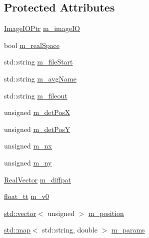 \subsection*{Protected Attributes}
\begin{DoxyCompactItemize}
\item 
\hyperlink{namespace_q_s_t_e_m_a4983475ef18f1a1f4bbfaabb6d187b9a}{Image\-I\-O\-Ptr} \hyperlink{class_q_s_t_e_m_1_1_c_base_wave_ac94d4576239a0b5f7cc82752b9b0b27e}{m\-\_\-image\-I\-O}
\item 
bool \hyperlink{class_q_s_t_e_m_1_1_c_base_wave_aeaa99c25f2184ccb5142d6204c77059b}{m\-\_\-real\-Space}
\item 
std\-::string \hyperlink{class_q_s_t_e_m_1_1_c_base_wave_ac5cc9c0ec149ffa044f94effb4deda85}{m\-\_\-file\-Start}
\item 
std\-::string \hyperlink{class_q_s_t_e_m_1_1_c_base_wave_ac9fac50838e8cc873467504c4d7d0b1a}{m\-\_\-avg\-Name}
\item 
std\-::string \hyperlink{class_q_s_t_e_m_1_1_c_base_wave_a2cbcf93f762ec3567e54a8294851abad}{m\-\_\-fileout}
\item 
unsigned \hyperlink{class_q_s_t_e_m_1_1_c_base_wave_a3d8f8283e497584b251359a13776f0bb}{m\-\_\-det\-Pos\-X}
\item 
unsigned \hyperlink{class_q_s_t_e_m_1_1_c_base_wave_a27adef2b5cac5a0b353b947333e5f4a1}{m\-\_\-det\-Pos\-Y}
\item 
unsigned \hyperlink{class_q_s_t_e_m_1_1_c_base_wave_ab5898946b6edd6fc0db7ad34d75073f3}{m\-\_\-nx}
\item 
unsigned \hyperlink{class_q_s_t_e_m_1_1_c_base_wave_aabad4f5469c50c2731b007d9ca904a6a}{m\-\_\-ny}
\item 
\hyperlink{namespace_q_s_t_e_m_a8dfe9e1dbecce3838cb082d96e991ba7}{Real\-Vector} \hyperlink{class_q_s_t_e_m_1_1_c_base_wave_af6ef0870685f4e8468db7d8f1e62cb8d}{m\-\_\-diffpat}
\item 
\hyperlink{namespace_q_s_t_e_m_a915d7caa497280d9f927c4ce8d330e47}{float\-\_\-tt} \hyperlink{class_q_s_t_e_m_1_1_c_base_wave_a2f96ab363b44b72175c51a6267d91336}{m\-\_\-v0}
\item 
\hyperlink{qmb_8m_af54b69a32590de218622e869b06b47b3}{std\-::vector}$<$ unsigned $>$ \hyperlink{class_q_s_t_e_m_1_1_c_base_wave_a51410242069752a7e1e506d57a331543}{m\-\_\-position}
\item 
\hyperlink{_displacement_params_8m_af619c74fd72bdb64d115463dff2720cd}{std\-::map}$<$ std\-::string, double $>$ \hyperlink{class_q_s_t_e_m_1_1_c_base_wave_aed67a43a81a61c94d60d47125b628f0e}{m\-\_\-params}

\end{DoxyCompactItemize}
